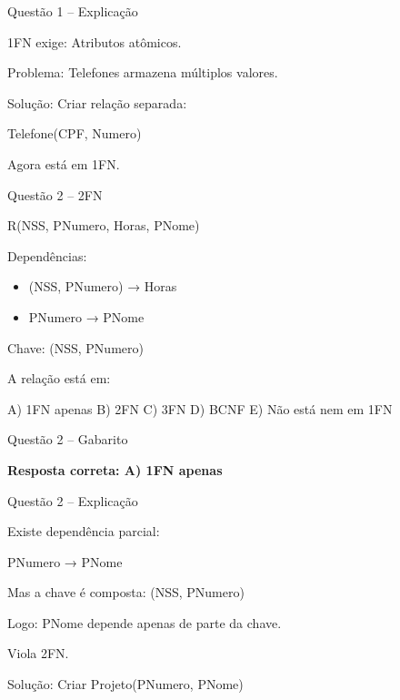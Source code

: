 \documentclass{beamer}
\begin{document}
\begin{frame}{Questão 1 – Explicação}

1FN exige:
Atributos atômicos.

Problema:
Telefones armazena múltiplos valores.

Solução:
Criar relação separada:

Telefone(CPF, Numero)

Agora está em 1FN.

\end{frame}





\begin{frame}{Questão 2 – 2FN}

R(NSS, PNumero, Horas, PNome)

Dependências:
\begin{itemize}
\item (NSS, PNumero) → Horas
\item PNumero → PNome
\end{itemize}

Chave: (NSS, PNumero)

A relação está em:

A) 1FN apenas  
B) 2FN  
C) 3FN  
D) BCNF  
E) Não está nem em 1FN  

\end{frame}





\begin{frame}{Questão 2 – Gabarito}

\Large \textbf{Resposta correta: A) 1FN apenas}

\end{frame}





\begin{frame}{Questão 2 – Explicação}

Existe dependência parcial:

PNumero → PNome

Mas a chave é composta:
(NSS, PNumero)

Logo:
PNome depende apenas de parte da chave.

Viola 2FN.

Solução:
Criar Projeto(PNumero, PNome)

\end{frame}
\end{document}
